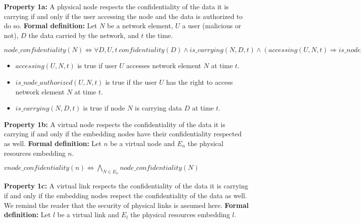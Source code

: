 
\textbf{Property 1a:} A physical node respects the confidentiality of the data it is carrying if and only if the user accessing the node and the data is authorized to do so.
\newline \textbf{Formal definition:} Let $N$ be a network element, $U$ a user (malicious or not), $D$ the data carried by the network, and $t$ the time.


\begin{myformula}
$node\_confidentiality(N) \Leftrightarrow \forall D,U,t~
confidentiality(D) \wedge is\_carrying(N,D,t) \wedge (accessing(U,N,t) \Rightarrow is\_node\_authorized(U,N,t))$
\end{myformula}

\begin{itemize}
\item $accessing(U,N,t)$ is true if user $U$ accesses network element $N$ at time $t$.
\item $is\_node\_authorized(U,N,t)$ is true if the user $U$ has the right to access network element $N$ at time $t$.
\item $is\_carrying(N,D,t)$ is true if node $N$ is carrying data $D$ at time $t$.
\end{itemize}

\textbf{Property 1b:} A virtual node respects the confidentiality of the data it is carrying if and only if the embedding nodes have their confidentiality respected as well.
\newline \textbf{Formal definition:} Let $n$ be a virtual node and $E_n$ the physical resources embedding $n$.


\begin{myformula}
$vnode\_confidentiality(n) \Leftrightarrow \bigwedge\limits_{N\in E_n} node\_confidentiality(N) $
\end{myformula}

\textbf{Property 1c:} A virtual link respects the confidentiality of the data it is carrying if and only if the embedding nodes respect the confidentiality of the data as well.
We remind the reader that the security of physical links is assumed here.
\newline \textbf{Formal definition:} Let $l$ be a virtual link and $E_l$ the physical resources embedding $l$.



